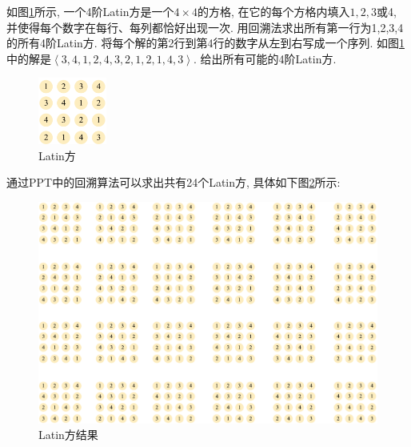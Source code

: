 \documentclass{article}
\begin{document}
\pagebreak


\begin{homeworkProblem}
	如图\ref{fig:Latin方}所示, 一个4阶Latin方是一个$4\times 4$的方格, 在它的每个方格内填入$1,2,3$或4, 并使得每个数字在每行、每列都恰好出现一次. 用回溯法求出所有第一行为1,2,3,4的所有4阶Latin方. 将每个解的第2行到第4行的数字从左到右写成一个序列. 如图\ref{fig:Latin方}中的解是$\left<3,4,1,2,4,3,2,1,2,1,4,3\right>$. 给出所有可能的4阶Latin方.
	\begin{figure}[H]
		\centering
		\includegraphics[width=0.2\textwidth]{images/title/Latin方.pdf}
		\caption{Latin方}
		\label{fig:Latin方}
	\end{figure}
	通过PPT中的回溯算法可以求出共有24个Latin方, 具体如下图\ref{fig:Latin方结果}所示:
	\begin{figure}[H]
		\centering
		\includegraphics[width=1.0\textwidth]{images/title/Latin方结果.pdf}
		\caption{Latin方结果}
		\label{fig:Latin方结果}
	\end{figure}
\end{homeworkProblem}




\end{document}
